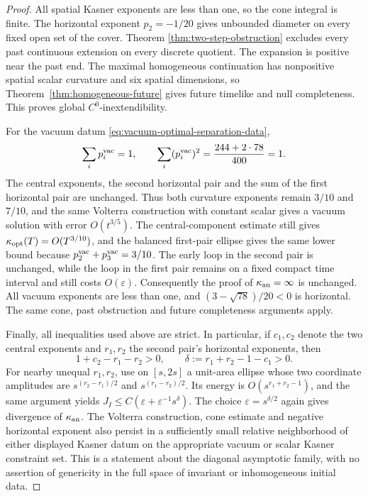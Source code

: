 \documentclass[10pt,a4paper]{article}
\numberwithin{equation}{section}
\theoremstyle{definition}
\theoremstyle{remark}
\begin{document}
\begin{proof}
All spatial Kasner exponents are less than one, so the cone integral
is finite.  The horizontal exponent $p_2=-1/20$ gives unbounded
diameter on every fixed open set of the cover.  Theorem
\ref{thm:two-step-obstruction} excludes every past continuous extension
on every discrete quotient.  The expansion is positive near the past
end.  The maximal homogeneous continuation has nonpositive spatial
scalar curvature and six spatial dimensions, so
Theorem~\ref{thm:homogeneous-future} gives future timelike and null
completeness.  This proves global $C^0$-inextendibility.

For the vacuum datum \eqref{eq:vacuum-optimal-separation-data},
\[
 \sum_i p_i^{\rm vac}=1,\qquad
 \sum_i(p_i^{\rm vac})^2
   =\frac{244+2\cdot78}{400}=1.
\]
The central exponents, the second horizontal pair and the sum of
the first horizontal pair are unchanged.  Thus both curvature
exponents remain $3/10$ and $7/10$, and the same Volterra construction
with constant scalar gives a vacuum solution with error $O(t^{3/5})$.
The central-component estimate still gives
$\kappa_{\rm opt}(T)=O(T^{3/10})$, and the balanced first-pair
ellipse gives the same lower bound because
$p_2^{\rm vac}+p_3^{\rm vac}=3/10$.
The early loop in the second pair
is unchanged, while the loop in the first pair remains on a fixed
compact time interval and still costs $O(\varepsilon)$.
Consequently the proof of $\kappa_{\rm an}=\infty$ is unchanged.
All vacuum exponents are less than one, and
$(3-\sqrt{78})/20<0$ is horizontal.  The same cone, past obstruction
and future completeness arguments apply.

Finally, all inequalities used above are strict.  In particular, if
$c_1,c_2$ denote the two central exponents and $r_1,r_2$ the second
pair's horizontal exponents, then
\[
 1+c_2-r_1-r_2>0,
 \qquad \delta:=r_1+r_2-1-c_1>0.
\]
For nearby unequal $r_1,r_2$, use on $[s,2s]$ a unit-area ellipse
whose two coordinate amplitudes are
$s^{(r_2-r_1)/2}$ and $s^{(r_1-r_2)/2}$.
Its energy is $O(s^{r_1+r_2-1})$, and the same argument yields
$J_I\le C(\varepsilon+\varepsilon^{-1}s^\delta)$.
The choice $\varepsilon=s^{\delta/2}$ again gives divergence of
$\kappa_{\rm an}$.  The Volterra construction, cone estimate and
negative horizontal exponent also persist in a sufficiently small
relative neighborhood of either displayed Kasner datum on the
appropriate vacuum or scalar Kasner constraint set.  This is a
statement about the diagonal
asymptotic family, with no assertion of genericity in the full space
of invariant or inhomogeneous initial data.
\end{proof}
\end{document}
